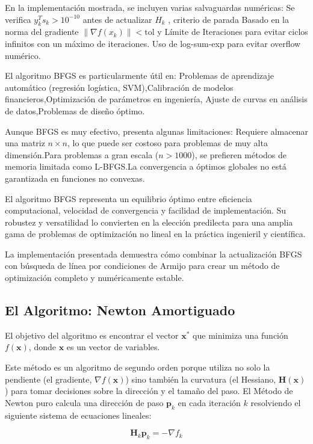 \documentclass{article}
\begin{document}
En la implementación mostrada, se incluyen varias salvaguardas numéricas:
Se verifica $y_k^T s_k > 10^{-10}$ antes de actualizar $H_k$
 , criterio de parada Basado en la norma del gradiente $\|\nabla f(x_k)\| < \text{tol}$
y Límite de Iteraciones para evitar ciclos infinitos con un máximo de iteraciones. Uso de log-sum-exp para evitar overflow numérico.

El algoritmo BFGS es particularmente útil en:
Problemas de aprendizaje automático (regresión logística, SVM),Calibración de modelos financieros,Optimización de parámetros en ingeniería, Ajuste de curvas en análisis de datos,Problemas de diseño óptimo.


Aunque BFGS es muy efectivo, presenta algunas limitaciones: Requiere almacenar una matriz $n \times n$, lo que puede ser costoso para problemas de muy alta dimensión.Para problemas a gran escala ($n > 1000$), se prefieren métodos de memoria limitada como L-BFGS.La convergencia a óptimos globales no está garantizada en funciones no convexas.

El algoritmo BFGS representa un equilibrio óptimo entre eficiencia computacional, velocidad de convergencia y facilidad de implementación. Su robustez y versatilidad lo convierten en la elección predilecta para una amplia gama de problemas de optimización no lineal en la práctica ingenieril y científica.

La implementación presentada demuestra cómo combinar la actualización BFGS con búsqueda de línea por condiciones de Armijo para crear un método de optimización completo y numéricamente estable.


\subsection{El Algoritmo: Newton Amortiguado}

El objetivo del algoritmo es encontrar el vector $\mathbf{x}^*$ que minimiza una función $f(\mathbf{x})$, donde $\mathbf{x}$ es un vector de variables.

Este método es un algoritmo de segundo orden porque utiliza no solo la pendiente (el gradiente, $\nabla f(\mathbf{x})$) sino también la curvatura (el Hessiano, $\mathbf{H}(\mathbf{x})$) para tomar decisiones sobre la dirección y el tamaño del paso.
El Método de Newton puro calcula una dirección de paso $\mathbf{p}_k$ en cada iteración $k$ resolviendo el siguiente sistema de ecuaciones lineales:

\[
\mathbf{H}_k \mathbf{p}_k = -\nabla f_k
\]
\end{document}
